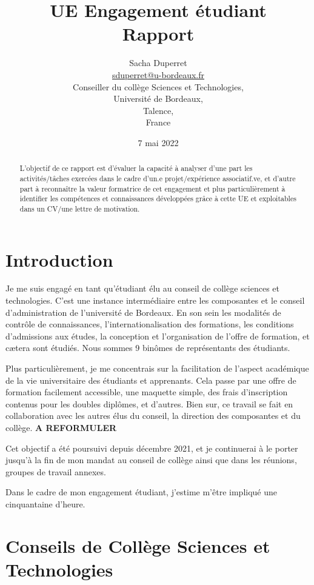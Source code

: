 \documentclass{article}
\title{{\huge UE Engagement étudiant\\Rapport}}
\author{$ $\\{\LARGE Sacha Duperret}\\ $ $\\ \href{mailto:sduperret@u-bordeaux.fr}{sduperret@u-bordeaux.fr}\\Conseiller du collège Sciences et Technologies,\\Université de Bordeaux,\\Talence,\\France}
\date{7 mai 2022}
\begin{document}
\maketitle

\vspace{20pt}

\tableofcontents

\vspace{50pt}

\begin{abstract}
L'objectif de ce rapport est d'évaluer la capacité à analyser d’une part les activités/tâches exercées dans le cadre d'un.e projet/expérience associatif.ve, et d’autre part à reconnaître la valeur formatrice de cet engagement et plus particulièrement à identifier les compétences et connaissances développées grâce à cette UE et exploitables dans un CV/une lettre de motivation.
\end{abstract}

\newpage \section*{Introduction}

Je me suis engagé en tant qu'étudiant élu au conseil de collège sciences et technologies. 
C'est une instance intermédiaire entre les composantes et le conseil d'administration de l'université de Bordeaux. 
En son sein les modalités de contrôle de connaissances, l'internationalisation des formations, les conditions d'admissions aux études, la conception et l'organisation de l'offre de formation, et cætera sont étudiés. 
Nous sommes 9 binômes de représentants des étudiants.

Plus particulièrement, je me concentrais sur la facilitation de l'aspect académique de la vie universitaire des étudiants et apprenants. 
Cela passe par une offre de formation facilement accessible, une maquette simple, des frais d'inscription contenus pour les doubles diplômes, et d'autres. 
Bien sur, ce travail se fait en collaboration avec les autres élus du conseil, la direction des composantes et du collège. \textbf{A REFORMULER}

Cet objectif a été poursuivi depuis décembre 2021, et je continuerai à le porter jusqu'à la fin de mon mandat au conseil de collège ainsi que dans les réunions, groupes de travail annexes.

\newpage
Dans le cadre de mon engagement étudiant, j'estime m'être impliqué une cinquantaine d'heure.

\section{Conseils de Collège Sciences et Technologies}
\end{document}
